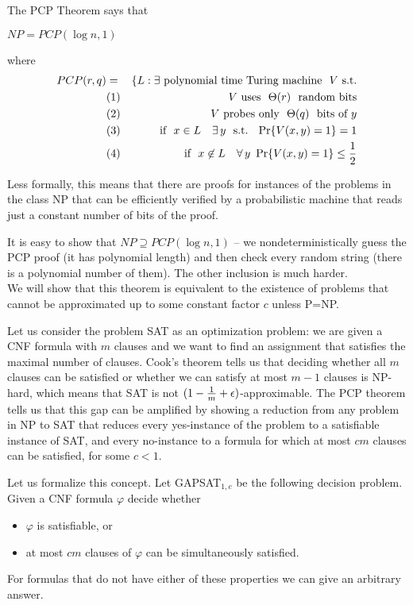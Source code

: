 \documentclass{llncs}
\begin{document}
The PCP Theorem says that
\begin{theorem} $NP = PCP(\log n, 1)$ \end{theorem}
where
\begin{eqnarray*}
PCP(r,q) & = & \{L: \exists \textrm{ polynomial time Turing machine }\ V\ {\rm s.t.} \\
&(1) & \quad V \textrm{ uses }\ \Theta(r)\ \textrm{ random bits} \\
&(2) & \quad V \textrm{ probes only }\ \Theta(q)\ \textrm{ bits of } y \\   
&(3) & \quad \textrm{if }\ x \in L \quad \exists\, y\ \textrm{ s.t. }\ \Pr\{V(x,y) = 1\} = 1\\
&(4) & \quad \textrm{if }\ x \not \in L \quad \forall\, y\ \Pr\{V(x,y) = 1\} \leq {1 \over 2}
\end{eqnarray*}

Less formally, this means that there are proofs for instances of the problems in the class NP that can be efficiently verified by a probabilistic machine that reads just a constant number of bits of the proof. 

It is easy to show that $NP \supseteq PCP(\log n, 1)$ -- we nondeterministically guess the PCP proof (it has polynomial length) and then check every random string (there is a polynomial number of them). The other inclusion is much harder.
\\

We will show that this theorem is equivalent to the existence of problems that cannot be approximated up to some constant factor $c$ unless P=NP. 

Let us consider the problem SAT as an optimization problem: we are given a CNF formula with $m$ clauses and we want to find an assignment that satisfies the maximal number of clauses. Cook's theorem tells us that deciding whether all $m$ clauses can be satisfied or whether we can satisfy at most $m-1$ clauses is NP-hard, which means that SAT is not $(1-{1 \over m} + \epsilon)$-approximable. The PCP theorem tells us that this gap can be amplified by showing a reduction from any problem in NP to SAT that reduces every yes-instance of the problem to a satisfiable instance of SAT, and every no-instance to a formula for which at most $cm$ clauses can be satisfied, for some $c < 1$. 


Let us formalize this concept. Let GAPSAT$_{1,c}$ be the following decision problem. Given a CNF formula $\varphi$ decide whether
\begin{itemize}
\item $\varphi$ is satisfiable, or
\item at most $cm$ clauses of $\varphi$ can be simultaneously satisfied.
\end{itemize}
For formulas that do not have either of these properties we can give an arbitrary answer. 
\end{document}
